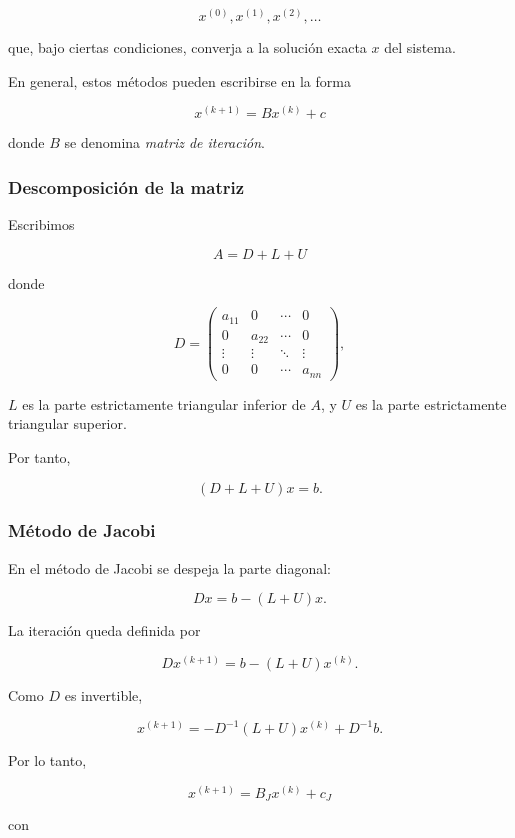 \documentclass[12pt]{article}
\begin{document}
\[
    x^{(0)},x^{(1)},x^{(2)},\ldots
\]

que, bajo ciertas condiciones, converja a la solución exacta $x$ del sistema.

En general, estos métodos pueden escribirse en la forma

\[
    \boxed{
    x^{(k+1)}=Bx^{(k)}+c
    }
\]

donde $B$ se denomina \emph{matriz de iteración}.

\subsubsection*{Descomposición de la matriz}

Escribimos

\[
    \boxed{
    A=D+L+U
    }
\]

donde

\[
D=
\begin{pmatrix}
a_{11} & 0      & \cdots & 0\\
0      & a_{22} & \cdots & 0\\
\vdots & \vdots & \ddots & \vdots\\
0      & 0      & \cdots & a_{nn}
\end{pmatrix},
\]

$L$ es la parte estrictamente triangular inferior de $A$, y $U$ es
la parte estrictamente triangular superior.

Por tanto,

\[
    (D+L+U)x=b.
\]


\subsubsection*{Método de Jacobi}

En el método de Jacobi se despeja la parte diagonal:

\[
    Dx=b-(L+U)x.
\]

La iteración queda definida por

\[
    Dx^{(k+1)}
    =
    b-(L+U)x^{(k)}.
\]

Como $D$ es invertible,

\[
    x^{(k+1)}
    =
    -D^{-1}(L+U)x^{(k)}
    +
    D^{-1}b.
\]

Por lo tanto,

\[
    \boxed{
    x^{(k+1)}
    =
    B_Jx^{(k)}+c_J
    }
\]

con
\end{document}
